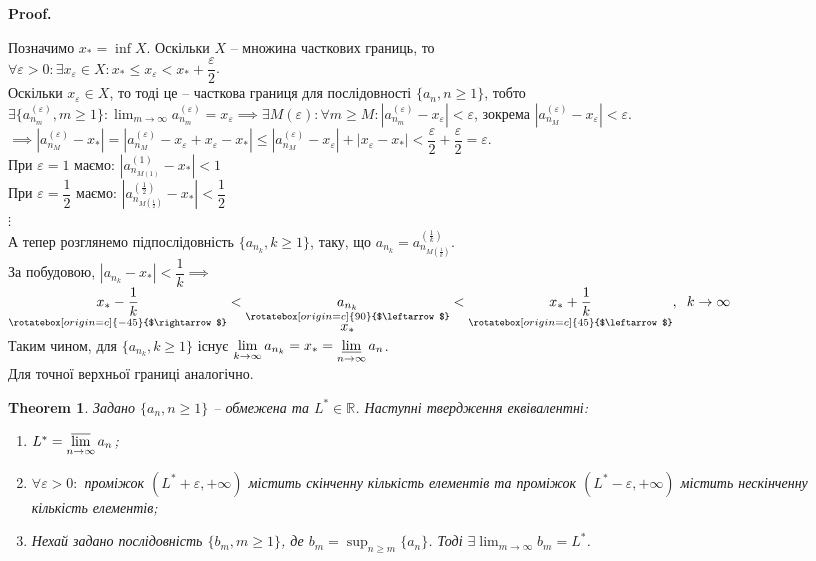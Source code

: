 \documentclass[a4paper, 14pt]{article}
\makeatletter
\def\qed{$\blacksquare$}
\theoremstyle{theoremdd}
\newtheorem{theorem}{Theorem}[subsection]
\theoremstyle{theoremdd}
\theoremstyle{theoremdd}
\theoremstyle{theoremdd}
\theoremstyle{theoremdd}
\theoremstyle{theoremdd}
\theoremstyle{theoremdd}
\theoremstyle{theoremdd}
\renewenvironment{proof}[1][Proof.\\]{\par
\pushQED{\hfill \qed}%
\normalfont \topsep6\p@\@plus6\p@\relax
\trivlist
\item\relax
{\bfseries
#1\@addpunct{.}}\hspace\labelsep\ignorespaces
}{%
\popQED\endtrivlist\@endpefalse
}
\makeatother
\begin{document}
	\begin{proof}
	Позначимо $x_* = \inf X$. Оскільки $X$ -- множина часткових границь, то\\
	$\forall \varepsilon > 0: \exists x_{\varepsilon} \in X: x_* \leq x_{\varepsilon} < x_* + \dfrac{\varepsilon}{2}$.\\
	Оскільки $x_\varepsilon \in X$, то тоді це -- часткова границя для послідовності $\{a_n, n \geq 1\}$, тобто \\ $\exists \{a_{n_m}^{(\varepsilon)}, m \geq 1\}: \displaystyle \lim_{m \to \infty} a_{n_m}^{(\varepsilon)} = x_{\varepsilon} \implies \exists M(\varepsilon): \forall m \geq M: |a_{n_m}^{(\varepsilon)} - x_{\varepsilon}| < \varepsilon$, зокрема $|a_{n_M}^{(\varepsilon)} - x_\varepsilon| < \varepsilon$.\\
	$\implies |a_{n_M}^{(\varepsilon)} - x_*| = |a_{n_M}^{(\varepsilon)} - x_{\varepsilon} + x_{\varepsilon} - x_*| \leq |a_{n_M}^{(\varepsilon)} - x_{\varepsilon}| + |x_{\varepsilon} - x_*| < \dfrac{\varepsilon}{2} + \dfrac{\varepsilon}{2} = \varepsilon$.\\
	При $\varepsilon = 1$ маємо: $|a_{n_{M(1)}}^{(1)} - x_*| < 1$\\
	При $\varepsilon = \dfrac{1}{2}$ маємо: $|a_{n_{M(\frac{1}{2})}}^{(\frac{1}{2})} - x_*| < \dfrac{1}{2}$\\
	$\vdots$\\
	А тепер розглянемо підпослідовність $\{a_{n_k}, k \geq 1\}$, таку, що $a_{n_k} = a_{n_{M(\frac{1}{k})}}^{(\frac{1}{k})}$.\\
	За побудовою, $|a_{n_k} - x_*| < \dfrac{1}{k} \implies$ $\displaystyle \underset{\rotatebox[origin=c]{-45}{$\rightarrow$}}{x_*-\frac{1}{k}} < \underset{\underset{\displaystyle x_*}{\rotatebox[origin=c]{90}{$\leftarrow$}}}{a_{n_k}} < \underset{\rotatebox[origin=c]{45}{$\leftarrow$}}{x_*+\frac{1}{k}}, \hspace{0.2cm} k \to \infty$\\
	Таким чином, для $\{a_{n_k}, k \geq 1\}$ існує $\displaystyle \lim_{k \to \infty} a_{n_k} = x_* = \varliminf_{n \to \infty} a_n$.
	\bigskip \\
	Для точної верхньої границі аналогічно.
	\end{proof}
	
	\begin{theorem}
	Задано $\{a_n, n \geq 1\}$ -- обмежена та $L^* \in \mathbb{R}$. Наступні твердження еквівалентні:
	\begin{enumerate}[nosep,wide=0pt,label={\arabic*)}]
	\item $L^* = \displaystyle \varlimsup_{n \to \infty} a_n$;
	\item $\forall \varepsilon > 0:$ проміжок $(L^*+\varepsilon, + \infty)$ містить скінченну кількість елементів та проміжок $(L^*-\varepsilon, + \infty)$ містить нескінченну кількість елементів;
	\item Нехай задано послідовність $\{b_m, m \geq 1\}$, де $b_m = \displaystyle \sup_{n \geq m} \{a_n\}$. Тоді $\exists \displaystyle \lim_{m \to \infty} b_m = L^*$.
	\end{enumerate}
	\end{theorem}
	
\end{document}

